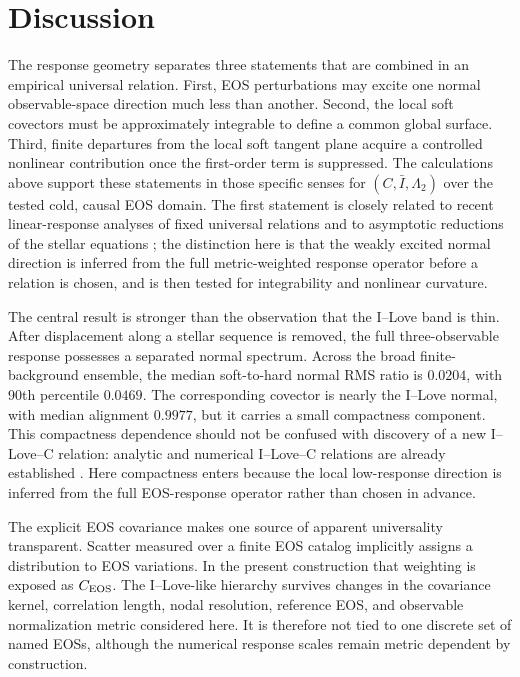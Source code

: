 \section{Discussion}

The response geometry separates three statements that are combined in an empirical universal relation. First, EOS perturbations may excite one normal observable-space direction much less than another. Second, the local soft covectors must be approximately integrable to define a common global surface. Third, finite departures from the local soft tangent plane acquire a controlled nonlinear contribution once the first-order term is suppressed. The calculations above support these statements in those specific senses for \((C,\bar I,\Lambda_2)\) over the tested cold, causal EOS domain. The first statement is closely related to recent linear-response analyses of fixed universal relations \cite{hu2026linear} and to asymptotic reductions of the stellar equations \cite{kamata2026asymptotic}; the distinction here is that the weakly excited normal direction is inferred from the full metric-weighted response operator before a relation is chosen, and is then tested for integrability and nonlinear curvature.

The central result is stronger than the observation that the I--Love band is thin. After displacement along a stellar sequence is removed, the full three-observable response possesses a separated normal spectrum. Across the broad finite-background ensemble, the median soft-to-hard normal RMS ratio is \(0.0204\), with 90th percentile \(0.0469\). The corresponding covector is nearly the I--Love normal, with median alignment \(0.9977\), but it carries a small compactness component. This compactness dependence should not be confused with discovery of a new I--Love--C relation: analytic and numerical I--Love--C relations are already established \cite{jiang2020ilovec}. Here compactness enters because the local low-response direction is inferred from the full EOS-response operator rather than chosen in advance.

The explicit EOS covariance makes one source of apparent universality transparent. Scatter measured over a finite EOS catalog implicitly assigns a distribution to EOS variations. In the present construction that weighting is exposed as \(C_{\rm EOS}\). The I--Love-like hierarchy survives changes in the covariance kernel, correlation length, nodal resolution, reference EOS, and observable normalization metric considered here. It is therefore not tied to one discrete set of named EOSs, although the numerical response scales remain metric dependent by construction.

